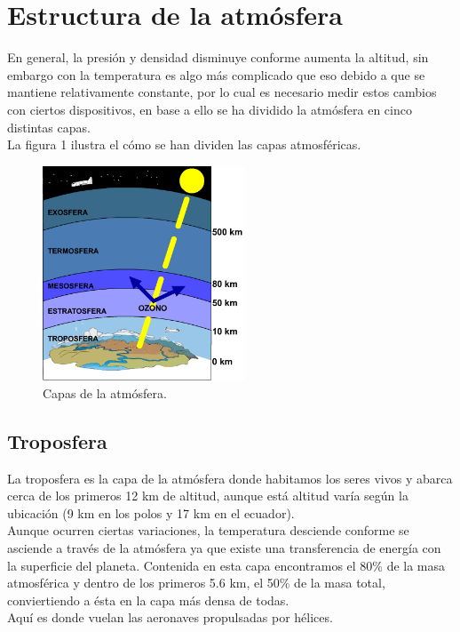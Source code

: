 \section{Estructura de la atmósfera}

En general, la presión y densidad disminuye conforme aumenta la
altitud, sin embargo con la temperatura es algo más complicado
que eso debido a que se mantiene relativamente constante, por lo
cual es necesario medir estos cambios con ciertos dispositivos,
en base a ello se ha dividido la atmósfera en cinco distintas capas.
\\[3mm] La figura 1 ilustra el cómo se han dividen las capas
atmosféricas.

\begin{figure}
\centering
\includegraphics[width=6cm]{CapasAtmosfera}
\caption{\label{capa}Capas de la atmósfera.}
\end{figure}

\subsection{Troposfera}   
La troposfera es la capa de la atmósfera donde habitamos los seres
vivos y abarca cerca de los primeros 12 km de altitud, aunque está             altitud varía según la ubicación (9 km en los polos y 17 km en el               ecuador).
\\[3mm] Aunque ocurren ciertas variaciones, la temperatura desciende                 conforme se asciende a través de la atmósfera ya que existe una transferencia de energía con la superficie del planeta. Contenida
en esta capa encontramos el 80\% de la masa atmosférica y dentro
de los primeros 5.6 km, el 50\% de la masa total, conviertiendo a
ésta en la capa más densa de todas.
\\[3mm] Aquí es donde vuelan las aeronaves propulsadas por hélices.
    
